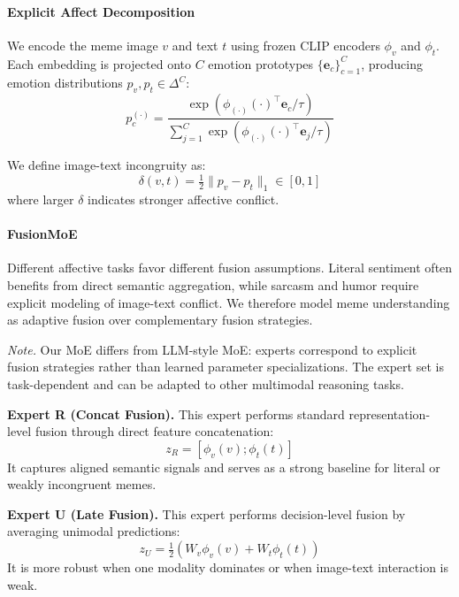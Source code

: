 \paragraph{Explicit Affect Decomposition}
We encode the meme image $v$ and text $t$ using frozen CLIP encoders $\phi_v$ and $\phi_t$. Each embedding is projected onto $C$ emotion prototypes $\{\mathbf{e}_c\}_{c=1}^C$, producing emotion distributions $p_v,p_t\in\Delta^C$:
\begin{equation}
  p^{(\cdot)}_c =
  \frac{\exp(\phi_{(\cdot)}(\cdot)^\top \mathbf{e}_c/\tau)}
       {\sum_{j=1}^C \exp(\phi_{(\cdot)}(\cdot)^\top \mathbf{e}_j/\tau)}
\end{equation}

We define image-text incongruity as:
\begin{equation}
  \delta(v,t)=\tfrac{1}{2}\|p_v-p_t\|_1 \in [0,1]
\end{equation}
where larger $\delta$ indicates stronger affective conflict.

\paragraph{FusionMoE}

Different affective tasks favor different fusion assumptions. Literal sentiment often benefits from direct semantic aggregation, while sarcasm and humor require explicit modeling of image-text conflict. We therefore model meme understanding as adaptive fusion over complementary fusion strategies.

\emph{Note.} Our MoE differs from LLM-style MoE: experts correspond to explicit fusion strategies rather than learned parameter specializations. The expert set is task-dependent and can be adapted to other multimodal reasoning tasks.

\textbf{Expert R (Concat Fusion).}
This expert performs standard representation-level fusion through direct feature concatenation:
\begin{equation}
  z_R=[\phi_v(v);\phi_t(t)]
\end{equation}
It captures aligned semantic signals and serves as a strong baseline for literal or weakly incongruent memes.

\textbf{Expert U (Late Fusion).}
This expert performs decision-level fusion by averaging unimodal predictions:
\begin{equation}
  z_U=\tfrac{1}{2}(W_v\phi_v(v)+W_t\phi_t(t))
\end{equation}
It is more robust when one modality dominates or when image-text interaction is weak.

